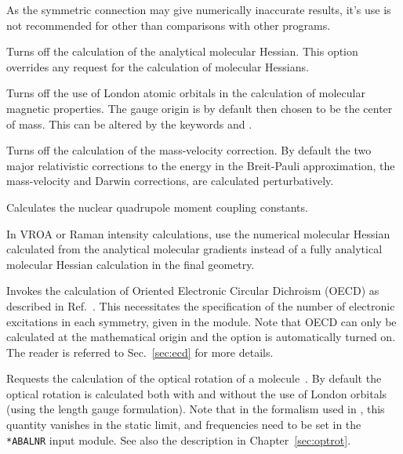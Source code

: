 \begin{description}
As the symmetric connection may give numerically inaccurate results,
it's use is not recommended for other than comparisons with other
programs.

\item[\Key{NOHESS}] Turns off the calculation of the analytical
molecular Hessian. This option overrides any request for the
calculation of molecular Hessians.

\item[\Key{NOLOND}] Turns off the use of London atomic
orbitals in
the calculation of molecular magnetic properties. The gauge origin is
by default then chosen to be the center of mass. This can be altered
by the keywords  and .

\item[\Key{NOMASV}] Turns off the calculation of the
mass-velocity
correction. By default the two major relativistic corrections to the
energy  in the Breit-Pauli approximation, the mass-velocity and Darwin
corrections, are calculated
perturbatively.

\item[\Key{NQCC}] Calculates the nuclear quadrupole moment
coupling constants.

\item[\Key{NUMHES}] In VROA or Raman intensity calculations, use the
  numerical molecular Hessian calculated from the analytical molecular gradients instead
  of a fully analytical molecular Hessian calculation in the final
  geometry.

\item[\Key{OECD}] Invokes the calculation of Oriented Electronic Circular Dichroism
(OECD)
as described in Ref.~\cite{tbpaehcpl246}. This
necessitates the specification of the number of electronic
excitations in
each symmetry, given in the  module.
Note that OECD can only be calculated at the mathematical origin
and the  option is automatically turned on.
The reader is referred to Sec.~\ref{sec:ecd} for more details.

\item[\Key{OPTROT}] Requests the calculation of the optical rotation
of a molecule~\cite{thkrklbpjjofd99,plpmp91}.
By default the optical rotation is calculated
both with and without the use of London orbitals
(using the length gauge formulation).
Note that in the
formalism used in \dalton , this quantity vanishes in the static
limit, and frequencies need to be set in the \verb|*ABALNR| input
module. See also the description in Chapter~\ref{sec:optrot}.


\end{description}
